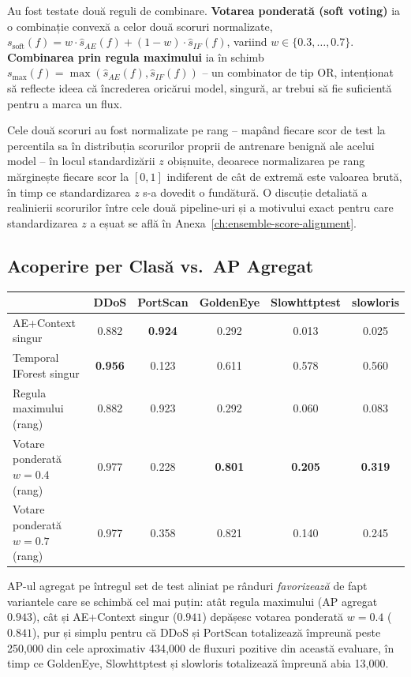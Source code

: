 Au fost testate două reguli de combinare. \textbf{Votarea ponderată (soft voting)} ia o combinație convexă a celor două scoruri normalizate, $s_{\text{soft}}(f) = w \cdot \hat{s}_{AE}(f) + (1-w) \cdot \hat{s}_{IF}(f)$, variind $w \in \{0.3, \dots, 0.7\}$. \textbf{Combinarea prin regula maximului} ia în schimb $s_{\text{max}}(f) = \max(\hat{s}_{AE}(f), \hat{s}_{IF}(f))$ -- un combinator de tip OR, intenționat să reflecte ideea că încrederea oricărui model, singură, ar trebui să fie suficientă pentru a marca un flux.

Cele două scoruri au fost normalizate pe rang -- mapând fiecare scor de test la percentila sa în distribuția scorurilor proprii de antrenare benignă ale acelui model -- în locul standardizării $z$ obișnuite, deoarece normalizarea pe rang mărginește fiecare scor la $[0,1]$ indiferent de cât de extremă este valoarea brută, în timp ce standardizarea $z$ s-a dovedit o fundătură. O discuție detaliată a realinierii scorurilor între cele două pipeline-uri și a motivului exact pentru care standardizarea $z$ a eșuat se află în Anexa~\ref{ch:ensemble-score-alignment}.

\subsection{Acoperire per Clasă vs.\ AP Agregat}
\label{sec:explain-ensemble-results}

\begin{center}
\begin{tabular}{@{}lccccc@{}}
\toprule
 & DDoS & PortScan & GoldenEye & Slowhttptest & slowloris \\
\midrule
AE+Context singur         & 0.882 & \textbf{0.924} & 0.292 & 0.013 & 0.025 \\
Temporal IForest singur   & \textbf{0.956} & 0.123 & 0.611 & 0.578 & 0.560 \\
Regula maximului (rang)   & 0.882 & 0.923 & 0.292 & 0.060 & 0.083 \\
Votare ponderată $w=0.4$ (rang) & 0.977 & 0.228 & \textbf{0.801} & \textbf{0.205} & \textbf{0.319} \\
Votare ponderată $w=0.7$ (rang) & 0.977 & 0.358 & 0.821 & 0.140 & 0.245 \\
\bottomrule
\end{tabular}
\end{center}

AP-ul agregat pe întregul set de test aliniat pe rânduri \emph{favorizează} de fapt variantele care se schimbă cel mai puțin: atât regula maximului (AP agregat $0.943$), cât și AE+Context singur ($0.941$) depășesc votarea ponderată $w=0.4$ ($0.841$), pur și simplu pentru că DDoS și PortScan totalizează împreună peste 250{,}000 din cele aproximativ 434{,}000 de fluxuri pozitive din această evaluare, în timp ce GoldenEye, Slowhttptest și slowloris totalizează împreună abia 13{,}000.


